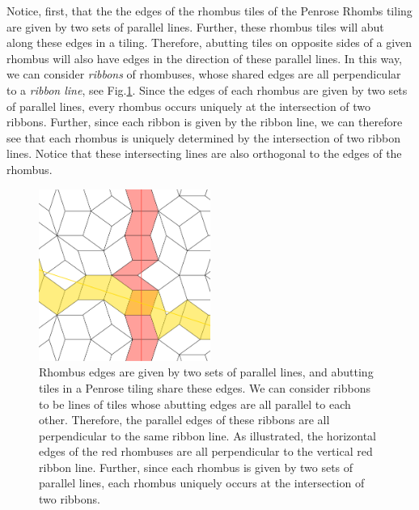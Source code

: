 \documentclass[
  oneside,
  11pt, a4paper,
  footinclude=true,
  headinclude=true,
  cleardoublepage=empty
]{scrbook}
\begin{document}
Notice, first, that the the edges of the rhombus tiles of the Penrose Rhombs tiling are given by two sets of parallel lines. Further, these rhombus tiles will abut along these edges in a tiling. Therefore, abutting tiles on opposite sides of a given rhombus will also have edges in the direction of these parallel lines. In this way, we can consider \textit{ribbons} of rhombuses, whose shared edges are all perpendicular to a \textit{ribbon line}, see Fig.\ref{fig:rhombribbons}. Since the edges of each rhombus are given by two sets of parallel lines, every rhombus occurs uniquely at the intersection of two ribbons. Further, since each ribbon is given by the ribbon line, we can therefore see that each rhombus is uniquely determined by the intersection of two ribbon lines. Notice that these intersecting lines are also orthogonal to the edges of the rhombus. 

\begin{figure}[H]
\centering
\includegraphics[width=0.5\textwidth]{RhombRibbons}
\caption[Ribbons of Rhombs]{Rhombus edges are given by two sets of parallel lines, and abutting tiles in a Penrose tiling share these edges. We can consider ribbons to be lines of tiles whose abutting edges are all parallel to each other. Therefore, the parallel edges of these ribbons are all perpendicular to the same ribbon line. As illustrated, the horizontal edges of the red rhombuses are all perpendicular to the vertical red ribbon line. Further, since each rhombus is given by two sets of parallel lines, each rhombus uniquely occurs at the intersection of two ribbons.}
\label{fig:rhombribbons}
\end{figure}
\end{document}
